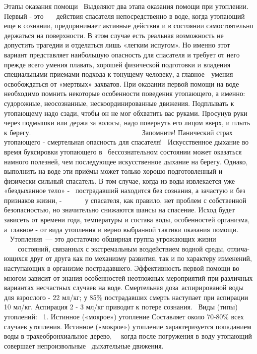 \documentclass[a4paper, 12pt]{article}
\theoremstyle{definition}
\begin{document}
        
        Этапы оказания помощи
         Выделяют два этапа оказания помощи при утоплении. Первый - это    действия спасателя непосредственно в воде, когда утопающий еще в сознании, предпринимает активные действия и в состоянии самостоятельно держаться на поверхности. В этом случае есть реальная возможность не допустить трагедии и отделаться лишь «легким испугом». Но именно этот вариант представляет наибольшую опасность для спасателя и требует от него прежде всего умения плавать, хорошей физической подготовки и владения специальными приемами подхода к тонущему человеку, а главное - умения освобождаться от «мертвых» захватов.
        При оказании первой помощи на воде необходимо помнить некоторые особенности поведения утопающего, а именно: судорожные, неосознанные, нескоординированные движения. Подплывать к утопающему надо сзади, чтобы он не мог обхватить вас руками. Просунув руки через подмышки или держа за волосы, надо повернуть его лицом вверх, и плыть к берегу.
                                             Запомните!
        Панический страх утопающего - смертельная опасность для спасателя!
         Искусственное дыхание во время буксировки утопающего в  бессознательном состоянии может оказаться намного полезней, чем последующее искусственное дыхание на берегу.
        Однако, выполнить на воде эти приёмы может только хорошо подготовленный и физически сильный спасатель.
        В том случае, когда из воды извлекается уже «бездыханное тело» -  пострадавший находится без сознания, а зачастую и без признаков жизни, -       у спасателя, как правило, нет проблем с собственной безопасностью, но значительно снижаются шансы на спасение. Исход будет зависеть от времени года, температуры и состава воды, особенностей организма, а главное - от вида утопления и верно выбранной тактики оказания помощи.   
         
        Утопления — это достаточно обширная группа угрожающих жизни     состояний, связанных с экс­тремальным воздействием водной среды, отлича­ющихся друг от друга как по механизму разви­тия, так и по характеру изменений, наступающих в организме пострадавшего. Эффективность пер­вой помощи во многом зависит от знания особенностей неотложных мероприятий при различных вариантах несчастных случаев на воде.
        Смертельная доза аспирированой воды для взрослого - 22 мл/кг; у 85\% пострадавших смерть наступает при аспирации 10 мл/кг. Аспирация 2 - 3 мл/кг приводит к потере сознания.
         Виды (типы) утоплений:
         1. Истинное («мокрое») утопление
        Составляет около 70-80\% всех случаев утопления. Истинное («мокрое») утопление характеризуется попаданием воды в трахеобронхиальное дерево,   когда после погружения в воду утопающий совершает непроизвольные  дыхательные движения.
\end{document}

